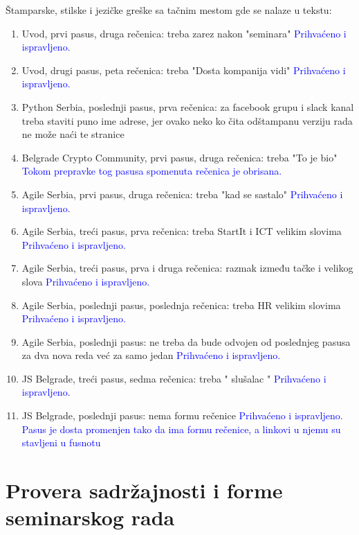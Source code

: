 \documentclass[a4paper]{report}
\newcommand{\odgovor}[1]{\textcolor{blue}{#1}}
\begin{document}
Štamparske, stilske i jezičke greške sa tačnim mestom gde se nalaze u tekstu:
\begin{enumerate}
\item Uvod, prvi pasus, druga rečenica: treba zarez nakon "{seminara}"
\odgovor{Prihvaćeno i ispravljeno.}
\item Uvod, drugi pasus, peta rečenica: treba "{Dosta kompanija vidi}"
\odgovor{Prihvaćeno i ispravljeno.}
\item Python Serbia, poslednji pasus, prva rečenica: za facebook grupu i slack kanal treba staviti puno ime adrese, jer ovako neko ko čita odštampanu verziju rada ne može naći te stranice
\item Belgrade Crypto Community, prvi pasus, druga rečenica: treba "To je bio"
\odgovor{Tokom prepravke tog pasusa spomenuta rečenica je obrisana.}
\item Agile Serbia, prvi pasus, druga rečenica: treba "kad se sastalo"
\odgovor{Prihvaćeno i ispravljeno.}
\item Agile Serbia, treći pasus, prva rečenica: treba StartIt i ICT velikim slovima
\odgovor{Prihvaćeno i ispravljeno.}
\item Agile Serbia, treći pasus, prva i druga rečenica: razmak između tačke i velikog slova
\odgovor{Prihvaćeno i ispravljeno.}
\item Agile Serbia, poslednji pasus, poslednja rečenica: treba HR velikim slovima
\odgovor{Prihvaćeno i ispravljeno.}
\item Agile Serbia, poslednji pasus: ne treba da bude odvojen od poslednjeg pasusa za dva nova reda već za samo jedan
\odgovor{Prihvaćeno i ispravljeno.}
\item JS Belgrade, treći pasus, sedma rečenica: treba " slušalac "
\odgovor{Prihvaćeno i ispravljeno.}
\item JS Belgrade, poslednji pasus: nema formu rečenice
\odgovor{Prihvaćeno i ispravljeno. Pasus je dosta promenjen tako da ima formu rečenice, a linkovi u njemu su stavljeni u fusnotu}
\end{enumerate}


\section{Provera sadržajnosti i forme seminarskog rada}
\end{document}
